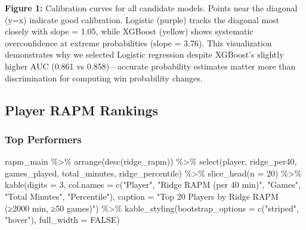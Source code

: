 \documentclass[
  letterpaper,
  DIV=11,
  numbers=noendperiod]{scrartcl}
\newenvironment{Shaded}{\begin{snugshade}}{\end{snugshade}}
\newcommand{\AttributeTok}[1]{\textcolor[rgb]{0.40,0.45,0.13}{#1}}
\newcommand{\ConstantTok}[1]{\textcolor[rgb]{0.56,0.35,0.01}{#1}}
\newcommand{\DecValTok}[1]{\textcolor[rgb]{0.68,0.00,0.00}{#1}}
\newcommand{\FunctionTok}[1]{\textcolor[rgb]{0.28,0.35,0.67}{#1}}
\newcommand{\NormalTok}[1]{\textcolor[rgb]{0.00,0.23,0.31}{#1}}
\newcommand{\SpecialCharTok}[1]{\textcolor[rgb]{0.37,0.37,0.37}{#1}}
\newcommand{\StringTok}[1]{\textcolor[rgb]{0.13,0.47,0.30}{#1}}
\begin{document}
\textbf{Figure 1:} Calibration curves for all candidate models. Points
near the diagonal (y=x) indicate good calibration. Logistic (purple)
tracks the diagonal most closely with slope = 1.05, while XGBoost
(yellow) shows systematic overconfidence at extreme probabilities (slope
= 3.76). This visualization demonstrates why we selected Logistic
regression despite XGBoost's slightly higher AUC (0.861 vs
0.858)---accurate probability estimates matter more than discrimination
for computing win probability changes.

\subsection{Player RAPM Rankings}\label{player-rapm-rankings}

\subsubsection{Top Performers}\label{top-performers}

\begin{Shaded}
\begin{Highlighting}[]
\NormalTok{rapm\_main }\SpecialCharTok{\%\textgreater{}\%}
  \FunctionTok{arrange}\NormalTok{(}\FunctionTok{desc}\NormalTok{(ridge\_rapm)) }\SpecialCharTok{\%\textgreater{}\%}
  \FunctionTok{select}\NormalTok{(player, ridge\_per40, games\_played, total\_minutes, ridge\_percentile) }\SpecialCharTok{\%\textgreater{}\%}
  \FunctionTok{slice\_head}\NormalTok{(}\AttributeTok{n =} \DecValTok{20}\NormalTok{) }\SpecialCharTok{\%\textgreater{}\%}
  \FunctionTok{kable}\NormalTok{(}\AttributeTok{digits =} \DecValTok{3}\NormalTok{,}
        \AttributeTok{col.names =} \FunctionTok{c}\NormalTok{(}\StringTok{"Player"}\NormalTok{, }\StringTok{"Ridge RAPM (per 40 min)"}\NormalTok{, }\StringTok{"Games"}\NormalTok{, }\StringTok{"Total Minutes"}\NormalTok{, }\StringTok{"Percentile"}\NormalTok{),}
        \AttributeTok{caption =} \StringTok{"Top 20 Players by Ridge RAPM (≥2000 min, ≥50 games)"}\NormalTok{) }\SpecialCharTok{\%\textgreater{}\%}
  \FunctionTok{kable\_styling}\NormalTok{(}\AttributeTok{bootstrap\_options =} \FunctionTok{c}\NormalTok{(}\StringTok{"striped"}\NormalTok{, }\StringTok{"hover"}\NormalTok{), }\AttributeTok{full\_width =} \ConstantTok{FALSE}\NormalTok{)}
\end{Highlighting}
\end{Shaded}
\end{document}
